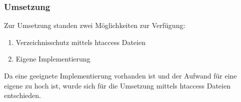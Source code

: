 \begin{frame} %
  \frametitle{Umsetzung} %

  Zur Umsetzung standen zwei Möglichkeiten zur Verfügung:
  \bigskip
  \begin{enumerate}
   \item Verzeichnisschutz mittels htaccess Dateien
   \item Eigene Implementierung
  \end{enumerate}

  \bigskip

  Da eine geeignete Implementierung vorhanden ist und der Aufwand für eine eigene zu hoch ist, wurde sich für die Umsetzung mittels htaccess Dateien entschieden.
\end{frame}

%
%
%
%
%
%

